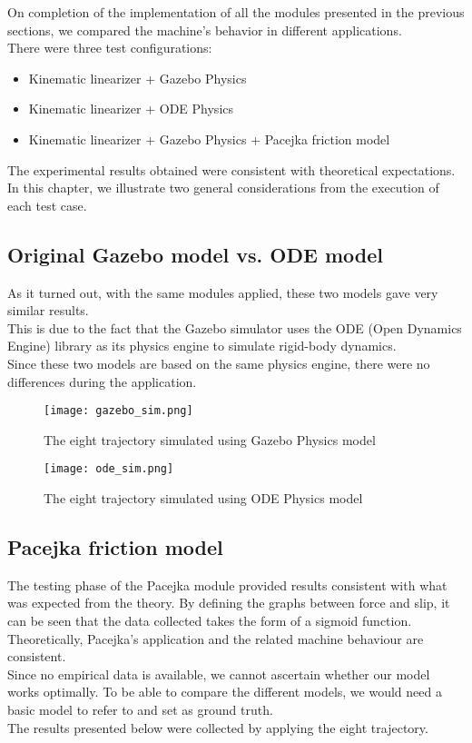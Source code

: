 On completion of the implementation of all the modules presented in the previous sections, we compared the machine's behavior in different applications.\\
There were three test configurations:
\begin{itemize}
	\item Kinematic linearizer + Gazebo Physics
	\item Kinematic linearizer + ODE Physics
	\item Kinematic linearizer + Gazebo Physics + Pacejka friction model 
\end{itemize}
The experimental results obtained were consistent with theoretical expectations. \\
In this chapter, we illustrate two general considerations from the execution of each test case.

\subsection{Original Gazebo model vs. ODE model}
As it turned out, with the same modules applied, these two models gave very similar results.\\
This is due to the fact that the Gazebo simulator uses the ODE (Open Dynamics Engine) library as its physics engine to simulate rigid-body dynamics.\\
Since these two models are based on the same physics engine, there were no differences during the application.

\begin{figure}[H]
	\texttt{[image: gazebo\_sim.png]}
	\caption{The eight trajectory simulated using Gazebo Physics model}
\end{figure}

\begin{figure}[H]
	\texttt{[image: ode\_sim.png]}
	\caption{The eight trajectory simulated using ODE Physics model}
\end{figure}


\subsection{Pacejka friction model}
The testing phase of the Pacejka module provided results consistent with what was expected from the theory. By defining the graphs between force and slip, it can be seen that the data collected takes the form of a sigmoid function.\\
Theoretically, Pacejka's application and the related machine behaviour are consistent. \\
Since no empirical data is available, we cannot ascertain whether our model works optimally. To be able to compare the different models, we would need a basic model to refer to and set as ground truth.\\
The results presented below were collected by applying the eight trajectory.

